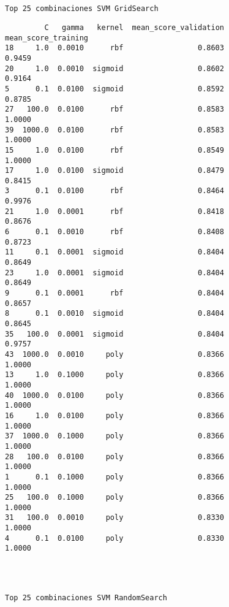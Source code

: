 \documentclass[11pt]{article}
\begin{document}
    \begin{Verbatim}[commandchars=\\\{\}]
 
 
Top 25 combinaciones SVM GridSearch

    \end{Verbatim}

    
    \begin{verbatim}
         C   gamma   kernel  mean_score_validation  mean_score_training
18     1.0  0.0010      rbf                 0.8603               0.9459
20     1.0  0.0010  sigmoid                 0.8602               0.9164
5      0.1  0.0100  sigmoid                 0.8592               0.8785
27   100.0  0.0100      rbf                 0.8583               1.0000
39  1000.0  0.0100      rbf                 0.8583               1.0000
15     1.0  0.0100      rbf                 0.8549               1.0000
17     1.0  0.0100  sigmoid                 0.8479               0.8415
3      0.1  0.0100      rbf                 0.8464               0.9976
21     1.0  0.0001      rbf                 0.8418               0.8676
6      0.1  0.0010      rbf                 0.8408               0.8723
11     0.1  0.0001  sigmoid                 0.8404               0.8649
23     1.0  0.0001  sigmoid                 0.8404               0.8649
9      0.1  0.0001      rbf                 0.8404               0.8657
8      0.1  0.0010  sigmoid                 0.8404               0.8645
35   100.0  0.0001  sigmoid                 0.8404               0.9757
43  1000.0  0.0010     poly                 0.8366               1.0000
13     1.0  0.1000     poly                 0.8366               1.0000
40  1000.0  0.0100     poly                 0.8366               1.0000
16     1.0  0.0100     poly                 0.8366               1.0000
37  1000.0  0.1000     poly                 0.8366               1.0000
28   100.0  0.0100     poly                 0.8366               1.0000
1      0.1  0.1000     poly                 0.8366               1.0000
25   100.0  0.1000     poly                 0.8366               1.0000
31   100.0  0.0010     poly                 0.8330               1.0000
4      0.1  0.0100     poly                 0.8330               1.0000
    \end{verbatim}

    
    \begin{Verbatim}[commandchars=\\\{\}]
 
 
 
Top 25 combinaciones SVM RandomSearch

    \end{Verbatim}
\end{document}
